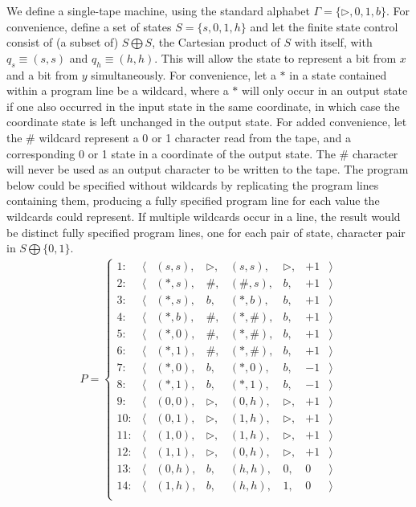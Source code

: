 We define a single-tape machine, using the standard alphabet $\Gamma=\{\triangleright, 0, 1, b\}$.  For convenience, define a set of states $S=\{s, 0, 1, h\}$ and let the finite state control consist of (a subset of) $S\bigoplus S$, the Cartesian product of $S$ with itself, with $q_s\equiv (s,s)$ and $q_h\equiv (h,h)$.  This will allow the state to represent a bit from $x$ and a bit from $y$ simultaneously.  For convenience, let a $*$ in a state contained within a program line be a wildcard, where a $*$ will only occur in an output state if one also occurred in the input state in the same coordinate, in which case the coordinate state is left unchanged in the output state.  For added convenience, let the $\#$ wildcard represent a 0 or 1 character read from the tape, and a corresponding 0 or 1 state in a coordinate of the output state.  The $\#$ character will never be used as an output character to be written to the tape.  The program below could be specified without wildcards by replicating the program lines containing them, producing a fully specified program line for each value the wildcards could represent.  If multiple wildcards occur in a line, the result would be distinct fully specified program lines, one for each pair of state, character pair in $S\bigoplus\{0,1\}$.
\begin{align*}
P=\left\{
\begin{array}{cccccrrr}     1: &\langle&(s,s),&\triangleright,&(s,s),&\triangleright,&+1&\rangle\\
       2: &\langle&(*,s),&\#,&(\#,s),&b,&+1&\rangle \\
       3: &\langle&(*,s),&b,&(*,b),&b,&+1&\rangle \\
       4: &\langle&(*,b),&\#,&(*,\#),&b,&+1&\rangle \\
       5: &\langle&(*,0),&\#,&(*,\#),&b,&+1&\rangle \\
       6: &\langle&(*,1),&\#,&(*,\#),&b,&+1&\rangle \\
       7: &\langle&(*,0),&b,&(*,0),&b,&-1&\rangle \\
       8: &\langle&(*,1),&b,&(*,1),&b,&-1&\rangle \\
       9: &\langle&(0,0),&\triangleright,&(0,h),&\triangleright,&+1&\rangle \\
       10: &\langle&(0,1),&\triangleright,&(1,h),&\triangleright,&+1&\rangle \\
       11: &\langle&(1,0),&\triangleright,&(1,h),&\triangleright,&+1&\rangle \\
       12: &\langle&(1,1),&\triangleright,&(0,h),&\triangleright,&+1&\rangle \\
       13: &\langle&(0,h),&b,&(h,h),&0,&0&\rangle \\
       14: &\langle&(1,h),&b,&(h,h),&1,&0&\rangle \\
       \end{array}\right.
\end{align*}
